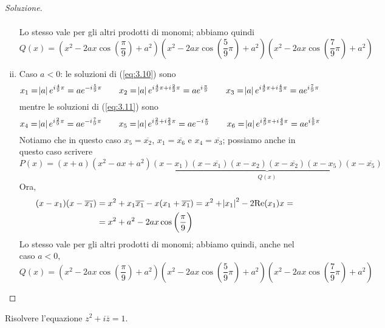\begin{proof}[Soluzione]
\begin{enumerate}[(i)]
\[\begin{split}
    \end{split}
    \]
    Lo stesso vale per gli altri prodotti di monomi; abbiamo quindi
    \[
    Q(x) = (x^2 -2{a}x\cos\left(\frac{\pi}{9}\right)+a^2)(x^2 -2{a}x\cos\left(\frac{5}{9}\pi\right) + a^2)(x^2 -2{a}x\cos\left(\frac{7}{9}\pi\right) + a^2)
    \]
    \item Caso $a<0$: le soluzioni di (\ref{eq:3.10}) sono
    \[
    x_1 = \abs{a} e^{i\frac{4}{9}\pi} = a e^{-i\frac{5}{9}\pi} \qquad x_2 =\abs{a}e^{i\frac{4}{9}\pi+i\frac{2}{3}\pi} = a e^{i\frac{\pi}{9}} \qquad x_3 = \abs{a}e^{i\frac{4}{9}\pi+i\frac{4}{3}\pi} = {a} e^{i\frac{7}{9}\pi}
    \]
    mentre le soluzioni di (\ref{eq:3.11}) sono
    \[
    x_4 = \abs{a} e^{i\frac{2}{9}\pi} = ae^{-i\frac{7}{9}\pi} \qquad x_5 =\abs{a}e^{i\frac{2}{9}+i\frac{2}{3}\pi} = {a}e^{-i\frac{\pi}{9}} \qquad x_6 = \abs{a}e^{i\frac{2}{9}\pi+i\frac{4}{3}\pi} = {a} e^{i\frac{5}{9}\pi}
    \]
    Notiamo che in questo caso $x_5 = \overline{x_2}$, $x_1 = \overline{x_6}$ e $x_4 = \overline{x_3}$; possiamo anche in questo caso scrivere
    \[
    P(x) = (x+a)(x^2-ax+a^2)\underbrace{(x-x_1)(x-\overline{x_1})(x-x_2)(x-\overline{x_2})(x-x_5)(x-\overline{x_5})}_{Q(x)}
    \]
    Ora,
    \[
    \begin{split}
        (x-x_1)(x-\overline{x_1}) &= x^2 + x_1 \overline{x_1}-x(x_1 + \overline{x_1}) = x^2 + \abs{x_1}^2 -2\mathrm{Re}(x_1)x = \\
        & ={ x^2 + a^2 -2{a}x\cos\left(\frac{\pi}{9}\right)}
    \end{split}
    \]
    Lo stesso vale per gli altri prodotti di monomi; abbiamo quindi, anche nel caso $a<0$,
    \[
    Q(x) = (x^2 -2{a}x\cos\left(\frac{\pi}{9}\right)+a^2)(x^2 -2{a}x\cos\left(\frac{5}{9}\pi\right) + a^2)(x^2 -2{a}x\cos\left(\frac{7}{9}\pi\right) + a^2)
    \]
    \end{enumerate}
\end{proof}
\begin{exercise}
    \label{ex:3.4}
    Risolvere l'equazione $z^2+i\overline{z} = 1$.
\end{exercise}
